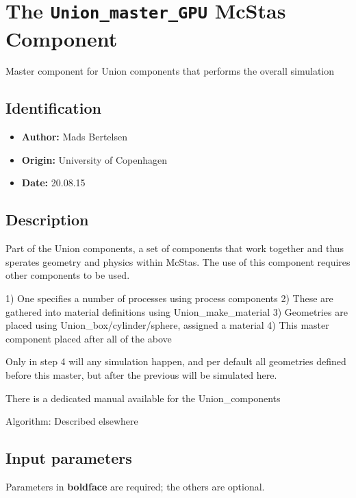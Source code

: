 \section{The \texttt{Union\_master\_GPU} McStas Component}
Master component for Union components that performs the overall simulation

\subsection*{Identification}
\begin{itemize}
  \item \textbf{Author:} Mads Bertelsen
  \item \textbf{Origin:} University of Copenhagen
  \item \textbf{Date:} 20.08.15
\end{itemize}

\subsection*{Description}
Part of the Union components, a set of components that work together and thus sperates geometry and physics within McStas. The use of this component requires other components to be used.

1) One specifies a number of processes using process components 2) These are gathered into material definitions using Union\_make\_material 3) Geometries are placed using Union\_box/cylinder/sphere, assigned a material 4) This master component placed after all of the above

Only in step 4 will any simulation happen, and per default all geometries defined before this master, but after the previous will be simulated here.

There is a dedicated manual available for the Union\_components

Algorithm: Described elsewhere

\subsection*{Input parameters}
Parameters in \textbf{boldface} are required; the others are optional.

